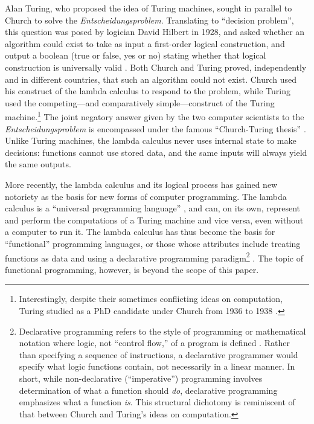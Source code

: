 \documentclass[twocolumn,titlepage,12pt]{article}
\begin{document}
Alan Turing, who proposed the idea of Turing machines, sought in parallel to Church to solve the \textit{Entscheidungsproblem}. Translating to ``decision problem'', this question was posed by logician David Hilbert in 1928, and asked whether an algorithm could exist to take as input a first-order logical construction, and output a boolean (true or false, yes or no) stating whether that logical construction is universally valid \cite{hilbert}. Both Church and Turing proved, independently and in different countries, that such an algorithm could not exist. Church used his construct of the lambda calculus to respond to the problem, while Turing used the competing---and comparatively simple---construct of the Turing machine.\footnote{Interestingly, despite their sometimes conflicting ideas on computation, Turing studied as a PhD candidate under Church from 1936 to 1938 \cite{churchpapers}.} The joint negatory answer given by the two computer scientists to the \textit{Entscheidungsproblem} is encompassed under the famous ``Church-Turing thesis'' \cite{churchturingthesis}. Unlike Turing machines, the lambda calculus never uses internal state to make decisions: functions cannot use stored data, and the same inputs will always yield the same outputs.

More recently, the lambda calculus and its logical process has gained new notoriety as the basis for new forms of computer programming. The lambda calculus is a ``universal programming language'' \cite{rojastutorial}, and can, on its own, represent and perform the computations of a Turing machine and vice versa, even without a computer to run it. The lambda calculus has thus become the basis for ``functional'' programming languages, or those whose attributes include treating functions as data and using a declarative programming paradigm\footnote{Declarative programming refers to the style of programming or mathematical notation where logic, not ``control flow,'' of a program is defined \cite{declarativeprogadv}. Rather than specifying a sequence of instructions, a declarative programmer would specify what logic functions contain, not necessarily in a linear manner. In short, while non-declarative (``imperative'') programming involves determination of what a function should \textit{do}, declarative programming emphasizes what a function \textit{is}. This structural dichotomy is reminiscent of that between Church and Turing's ideas on computation.} \cite{hudakevolution}. The topic of functional programming, however, is beyond the scope of this paper.
\end{document}
